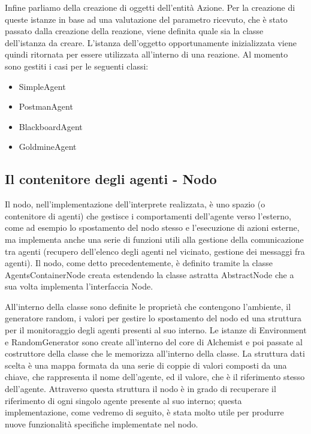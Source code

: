 Infine parliamo della creazione di oggetti dell'entità Azione. Per la creazione di queste istanze in base ad una valutazione del parametro ricevuto, che è stato passato dalla creazione della reazione, viene definita quale sia la classe dell'istanza da creare.
L'istanza dell'oggetto opportunamente inizializzata viene quindi ritornata per essere utilizzata all'interno di una reazione.
Al momento sono gestiti i casi per le seguenti classi:
\begin{itemize}
\item SimpleAgent
\item PostmanAgent
\item BlackboardAgent
\item GoldmineAgent
\end{itemize}


\subsection{Il contenitore degli agenti - Nodo}\label{sctn:AgentsContainerNode}
Il nodo, nell'implementazione dell'interprete realizzata, è uno spazio (o contenitore di agenti) che gestisce i comportamenti dell'agente verso l'esterno, come ad esempio lo spostamento del nodo stesso e l'esecuzione di azioni esterne, ma implementa anche una serie di funzioni utili alla gestione della comunicazione tra agenti (recupero dell'elenco degli agenti nel vicinato, gestione dei messaggi fra agenti). Il nodo, come detto precedentemente, è definito tramite la classe AgentsContainerNode creata estendendo la classe astratta AbstractNode che a sua volta implementa l'interfaccia Node.

All'interno della classe sono definite le proprietà che contengono l'ambiente, il generatore random, i valori per gestire lo spostamento del nodo ed una struttura per il monitoraggio degli agenti presenti al suo interno.
Le istanze di Environment e RandomGenerator sono create all'interno del core di Alchemist e poi passate al costruttore della classe che le memorizza all'interno della classe. %
La struttura dati scelta è una mappa formata da una serie di coppie di valori composti da una chiave, che rappresenta il nome dell'agente, ed il valore, che è il riferimento stesso dell'agente. Attraverso questa struttura il nodo è in grado di recuperare il riferimento di ogni singolo agente presente al suo interno; questa implementazione, come vedremo di seguito, è stata molto utile per produrre nuove funzionalità specifiche implementate nel nodo.

